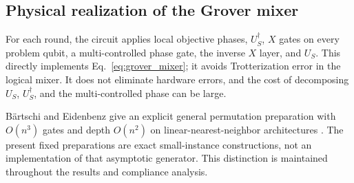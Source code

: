\subsection{Physical realization of the Grover mixer}

For each round, the circuit applies local objective phases, $U_S^\dagger$, $X$ gates on every problem qubit, a multi-controlled phase gate, the inverse $X$ layer, and $U_S$. This directly implements Eq.~\eqref{eq:grover_mixer}; it avoids Trotterization error in the logical mixer. It does not eliminate hardware errors, and the cost of decomposing $U_S$, $U_S^\dagger$, and the multi-controlled phase can be large.

Bärtschi and Eidenbenz give an explicit general permutation preparation with $O(n^3)$ gates and depth $O(n^2)$ on linear-nearest-neighbor architectures \cite{baertschi2020}. The present fixed preparations are exact small-instance constructions, not an implementation of that asymptotic generator. This distinction is maintained throughout the results and compliance analysis.
